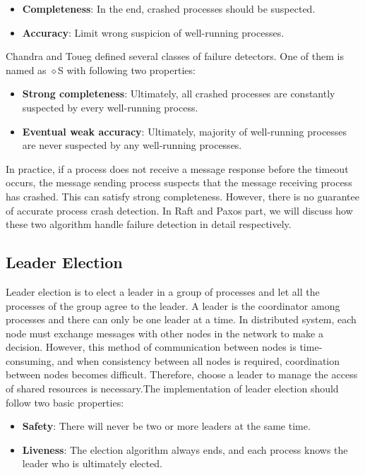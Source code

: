 \documentclass[12pt, a4paper]{article}
\begin{document}
\begin{itemize}
  \item \textbf{Completeness}: In the end, crashed processes should be 
  suspected. 
  \item \textbf{Accuracy}: Limit wrong suspicion of well-running processes. 
\end{itemize}

Chandra and Toueg\cite{chandra1996unreliable} defined several classes of failure 
detectors. One of them is named as $\diamond$S with following two properties:

\begin{itemize}
  \item \textbf{Strong completeness}: Ultimately, all crashed processes are 
  constantly suspected by every well-running process.
  \item \textbf{Eventual weak accuracy}: Ultimately, majority of well-running 
  processes are never suspected by any well-running processes.
\end{itemize}

In practice, if a process does not receive a message response before the timeout 
occurs, the message sending process suspects that the message receiving process 
has crashed. This can satisfy strong completeness. However, there is no 
guarantee of accurate process crash detection. In Raft and Paxos part, we will 
discuss how these two algorithm handle failure detection in detail respectively.

\subsection{Leader Election}

Leader election is to elect a leader in a group of processes and let all the 
processes of the group agree to the leader. A leader is the coordinator among 
processes and there can only be one leader at a time. In distributed system, 
each node must exchange messages with other nodes in the network to make a 
decision. However, this method of communication between nodes is time-consuming, 
and when consistency between all nodes is required, coordination between nodes 
becomes difficult. Therefore, choose a leader to manage the access of shared 
resources is necessary.The implementation of leader election should follow two 
basic properties\cite{nugraheni2009formal}:

\begin{itemize}
  \item \textbf{Safety}: There will never be two or more leaders at the same 
  time.
  \item \textbf{Liveness}: The election algorithm always ends, and each process 
  knows the leader who is ultimately elected.
\end{itemize}
\end{document}
